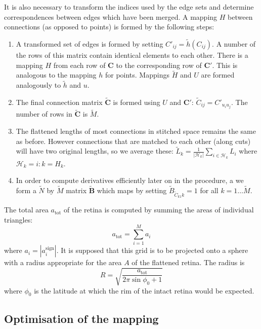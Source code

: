 \documentclass{article}
\begin{document}
It is also necessary to transform the indices used by the edge sets
and determine correspondences between edges which have been merged. A
mapping $H$ between connections (as opposed to points) is formed by
the following steps:
\begin{enumerate}
\item A transformed set of edges is formed by setting $C'_{ij} =
  \tilde h(C_{ij})$. A number of the rows of this matrix contain
  identical elements to each other. There is a mapping $H$ from each
  row of $\mathbf{C}$ to the corresponding row of $\mathbf{C'}$. This
  is analogous to the mapping $h$ for points. Mappings $\tilde{H}$ and
  $U$ are formed analogously to $\tilde{h}$ and $u$.
\item The final connection matrix $\tilde{\mathbf{C}}$ is formed using
  $U$ and $\mathbf{C}'$: $\tilde C_{ij} = C'_{u_iu_j}$. The number
  of rows in $\tilde{\mathbf{C}}$ is $\tilde M$.
\item The flattened lengths of most connections in stitched space
  remains the same as before. However connections that are matched to
  each other (along cuts) will have two original lengths, so we
  average these: $\tilde L_k = \frac{1}{|\mathcal{H}_k|}
  \sum_{i\in\mathcal{H}_k} L_i$ where $\mathcal{H}_k = i: k=H_k$.
\item In order to compute derivatives efficiently later on in the
  procedure, a we form a $\tilde N$ by $\tilde M$ matrix
  $\tilde{\mathbf{B}}$ which maps by setting $\tilde B_{\tilde
    C_{k1}k} = 1$ %
  for all
  $k=1\dots \tilde M$.
\end{enumerate}

The total area $a_\mathrm{tot}$ of the retina is computed by summing the areas of
individual triangles:
\begin{displaymath}
  a_\mathrm{tot} = \sum_{i=1}^M a_i
\end{displaymath}
where $a_i = | a_i^\mathrm{sign}|$.  It is supposed that this grid is
to be projected onto a sphere with a radius appropriate for the area
$A$ of the flattened retina. The radius is
\begin{equation}
  \label{fold-sphere:eq:1}
  R = \sqrt{\frac{a_\mathrm{tot}}{2\pi\sin\phi_0+1}}
\end{equation}
where $\phi_0$ is the latitude at which the rim of the intact retina
would be expected.


\subsection{Optimisation of the mapping}
\label{fold-sphere:sec:energy-function}
\end{document}
